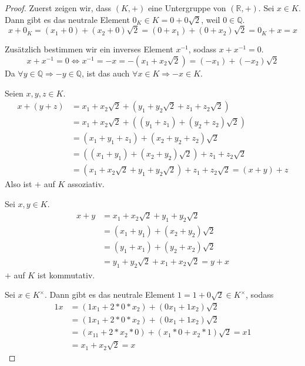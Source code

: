 \documentclass[a4paper,10pt]{article}
\begin{document}
\begin{proof}
 Zuerst zeigen wir, dass $(K, +)$ eine Untergruppe von $(\mathbb{R}, +)$.
 Sei $x \in K$.
 Dann gibt es das neutrale Element $0_K \in K = 0 + 0\sqrt{2}$, weil $0 \in \mathbb{Q}$.
 \begin{equation*}
  x + 0_K = (x_1 + 0) + (x_2 + 0)\sqrt{2} = (0 + x_1) + (0 + x_2)\sqrt{2} = 0_K + x = x
 \end{equation*}
 
 Zusätzlich bestimmen wir ein inverses Element $x^{-1}$, sodass $x + x^{-1} = 0$.
 \begin{equation*}
  x + x^{-1} = 0 \Leftrightarrow x^{-1} = -x = -(x_1 + x_2\sqrt{2}) = (-x_1) + (-x_2)\sqrt{2}
 \end{equation*}
 Da $\forall y \in \mathbb{Q} \Rightarrow -y \in \mathbb{Q}$, ist das auch $\forall x \in K \Rightarrow -x \in K$.
 
 Seien $x, y, z \in K$.
 \begin{align*}
  x + (y + z) & = x_1 + x_2\sqrt{2} + (y_1 + y_2\sqrt{2} + z_1 + z_2\sqrt{2})\\
  & = x_1 + x_2\sqrt{2} + ((y_1 + z_1) + (y_2 + z_2)\sqrt{2})\\
  & = (x_1 + y_1 + z_1) + (x_2 + y_2 + z_2)\sqrt{2}\\
  & = ((x_1 + y_1) + (x_2 + y_2)\sqrt{2}) + z_1 + z_2\sqrt{2}\\
  & = (x_1 + x_2\sqrt{2} + y_1 + y_2\sqrt{2}) + z_1 + z_2\sqrt{2} = (x + y) + z
 \end{align*}
 Also ist $+$ auf $K$ assoziativ.
 
 Sei $x, y \in K$.
 \begin{align*}
  x + y & = x_1 + x_2\sqrt{2} + y_1 + y_2\sqrt{2}\\
  & = (x_1 + y_1) + (x_2 + y_2)\sqrt{2}\\
  & = (y_1 + x_1) + (y_2 + x_2)\sqrt{2}\\
  & = y_1 + y_2\sqrt{2} + x_1 + x_2\sqrt{2} = y + x
 \end{align*}
 $+$ auf $K$ ist kommutativ.
 
 Sei $x \in K^\times$.
 Dann gibt es das neutrale Element $1 = 1 + 0\sqrt{2} \in K^\times$, sodass
 \begin{align*}
  1x & = (1x_1 + 2 * 0 * x_2) + (0x_1 + 1x_2)\sqrt{2}\\
  & = (1x_1 + 2 * 0 * x_2) + (0x_1 + 1x_2)\sqrt{2}\\
  & = (x_11 + 2 * x_2 * 0) + (x_1 * 0 + x_2 * 1)\sqrt{2} = x1\\
  & = x_1 + x_2\sqrt{2} = x
 \end{align*}
 

\end{proof}
\end{document}
